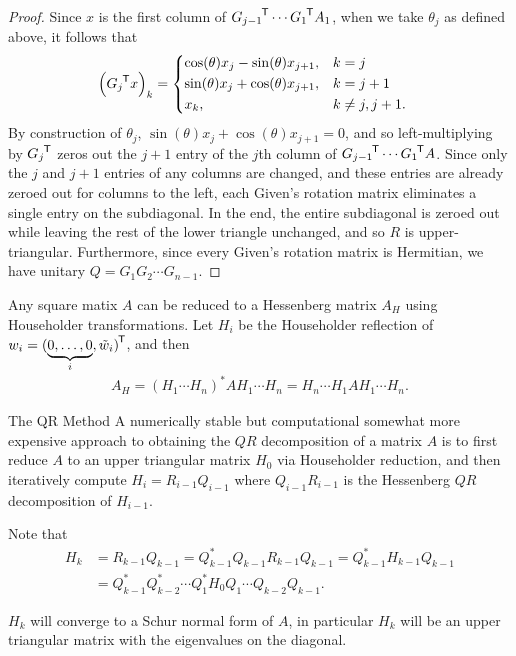 \begin{proof}
    Since $x$ is the first column of ${G_{j-1}}^{\mkern-1.5mu\mathsf{T}}\cdots{G_{1}}^{\mkern-1.5mu\mathsf{T}}A_{1}$, when we take $\theta_j$ as defined above, it follows that
    \begin{align*}
        \left({G_{j}}^{\mkern-1.5mu\mathsf{T}}x\right)_k &= \begin{dcases}
            \cos(\theta)x_j - \sin(\theta)x_{j+1}, &k=j \\
            \sin(\theta)x_j + \cos(\theta)x_{j+1}, &k=j+1 \\
            x_k, &k\neq j,j+1.
        \end{dcases}
    \end{align*}
    By construction of $\theta_j$, $\sin(\theta)x_j + \cos(\theta)x_{j+1} = 0$, and so left-multiplying by ${G_{j}}^{\mkern-1.5mu\mathsf{T}}$ zeros out the $j+1$ entry of the $j$th column of ${G_{j-1}}^{\mkern-1.5mu\mathsf{T}}\cdots{G_1}^{\mkern-1.5mu\mathsf{T}}A$. Since only the $j$ and $j+1$ entries of any columns are changed, and these entries are already zeroed out for columns to the left, each Given's rotation matrix eliminates a single entry on the subdiagonal. In the end, the entire subdiagonal is zeroed out while leaving the rest of the lower triangle unchanged, and so $R$ is upper-triangular. Furthermore, since every Given's rotation matrix is Hermitian, we have unitary $Q = G_1G_2\cdots G_{n-1}$.
\end{proof}

\begin{thm}
    Any square matix $A$ can be reduced to a Hessenberg matrix $A_H$ using Householder transformations. Let $H_i$ be the Householder reflection of $w_i = {(\underbrace{0, \ldots, 0}_{i}, \tilde{w}_i)}^{\mkern-1.5mu\mathsf{T}}$, and then
    \begin{align*}
        A_H = \left(H_1 \cdots H_n\right)^{*}A H_1 \cdots H_n = H_n \cdots H_1 A H_1 \cdots H_n.
    \end{align*}
\end{thm}

\begin{defn}{The QR Method}\proofbreak
    A numerically stable but computational somewhat more expensive approach to obtaining the $QR$ decomposition of a matrix $A$ is to first reduce $A$ to an upper triangular matrix $H_0$ via Householder reduction, and then iteratively compute $H_i = R_{i-1}Q_{i-1}$ where $Q_{i-1}R_{i-1}$ is the Hessenberg $QR$ decomposition of $H_{i-1}$.

    Note that
    \begin{align*}
        H_k &= R_{k-1}Q_{k-1} = Q_{k-1}^{*}Q_{k-1}R_{k-1}Q_{k-1} = Q_{k-1}^{*}H_{k-1}Q_{k-1} \\
        &= Q_{k-1}^{*}Q_{k-2}^{*}\cdots Q_{1}^{*}H_0Q_1 \cdots Q_{k-2}Q_{k-1}.
    \end{align*}

    $H_k$ will converge to a Schur normal form of $A$, in particular $H_k$ will be an upper triangular matrix with the eigenvalues on the diagonal.
\end{defn}

